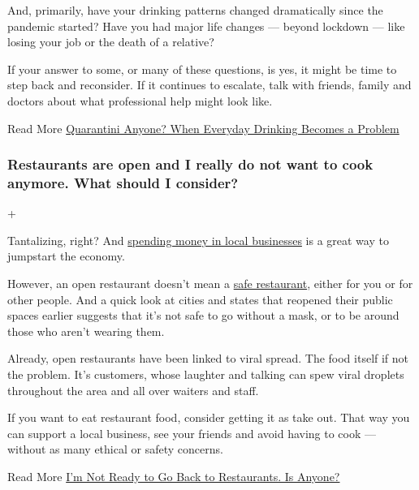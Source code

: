 And, primarily, have your drinking patterns changed dramatically since
the pandemic started? Have you had major life changes --- beyond
lockdown --- like losing your job or the death of a relative?

If your answer to some, or many of these questions, is yes, it might be
time to step back and reconsider. If it continues to escalate, talk with
friends, family and doctors about what professional help might look
like.

 Read More
\href{https://www.nytimes3xbfgragh.onion/2020/04/30/us/30IHW-drinking-women-coronavirus-quarantine-habit.html}{Quarantini
Anyone? When Everyday Drinking Becomes a Problem}

\hypertarget{restaurants-are-open-and-i-really-do-not-want-to-cook-anymore-what-should-i-consider}{%
\subsubsection{Restaurants are open and I really do not want to cook
anymore. What should I
consider?}\label{restaurants-are-open-and-i-really-do-not-want-to-cook-anymore-what-should-i-consider}}

+

Tantalizing, right? And
\href{https://www.nytimes3xbfgragh.onion/2020/06/23/dining/outdoor-restaurants-nyc-coronavirus.html}{spending
money in local businesses} is a great way to jumpstart the economy.

However, an open restaurant doesn't mean a
\href{https://www.nytimes3xbfgragh.onion/2020/05/15/dining/restaurant-opening-safety-coronavirus.html}{safe
restaurant}, either for you or for other people. And a quick look at
cities and states that reopened their public spaces earlier suggests
that it's not safe to go without a mask, or to be around those who
aren't wearing them.

Already, open restaurants have been linked to viral spread. The food
itself if not the problem. It's customers, whose laughter and talking
can spew viral droplets throughout the area and all over waiters and
staff.

If you want to eat restaurant food, consider getting it as take out.
That way you can support a local business, see your friends and avoid
having to cook --- without as many ethical or safety concerns.

 Read More
\href{https://www.nytimes3xbfgragh.onion/2020/06/30/dining/restaurant-risks-coronavirus.html}{I'm
Not Ready to Go Back to Restaurants. Is Anyone?}

